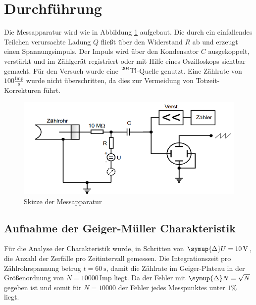 \section{Durchführung}
\label{sec:Durchführung}
Die Messapparatur wird wie in Abbildung \ref{fig:Schalt} aufgebaut.
Die durch ein einfallendes Teilchen verursachte Ladung $Q$ fließt über den Widerstand $R$ ab und erzeugt einen Spannungsimpuls.
Der Impuls wird über den Kondensator $C$ ausgekoppelt, verstärkt und im Zählgerät registriert oder mit Hilfe eines Oszilloskops sichtbar gemacht.
Für den Versuch wurde eine $\ce{^{204}Tl}$-Quelle genutzt.
Eine Zählrate von $100 \frac{\text{Imp}}{\text{s}}$ wurde nicht überschritten, da dies zur Vermeidung von Totzeit-Korrekturen führt.
\begin{figure}
    \centering
    \includegraphics[scale=0.6]{pics/Schalt.png}
    \caption{Skizze der Messapparatur}
    \label{fig:Schalt}
  \end{figure}
\subsection{Aufnahme der Geiger-Müller Charakteristik}
Für die Analyse der Charakteristik wurde, in Schritten von $\symup{\Delta}U=\SI{10}{\volt}$, die Anzahl der Zerfälle pro Zeitintervall gemessen.
Die Integrationszeit pro Zählrohrspannung betrug $t=\SI{60}{\second}$, damit die Zählrate im Geiger-Plateau in der Größenordnung von $N=10000\,  \text{Imp}$ liegt.
Da der Fehler mit $\symup{\Delta}N=\sqrt{N}$ gegeben ist und somit für $N=10000$ der Fehler jedes Messpunktes unter $1\% $ liegt.
